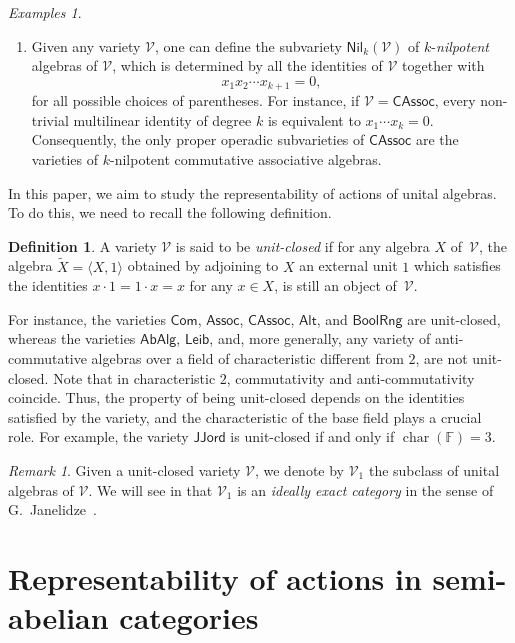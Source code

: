 \documentclass[reqno,a4paper]{amsart}
\theoremstyle{plain}
\theoremstyle{definition}
\newtheorem{definition}[subsection]{Definition}
\theoremstyle{remark}
\newtheorem{remark}[subsection]{Remark}
\newtheorem{examples}[subsection]{Examples}
\numberwithin{equation}{section}
\newcommand{\F}{\mathbb{F}}
\newcommand{\V}{\mathcal{V}}
\newcommand{\Assoc}{\ensuremath{\mathsf{Assoc}}}
\newcommand{\Leib}{\ensuremath{\mathsf{Leib}}}
\newcommand{\BoolRng}{\ensuremath{\mathsf{BoolRng}}}
\newcommand{\CAssoc}{\ensuremath{\mathsf{CAssoc}}}
\newcommand{\Com}{\ensuremath{\mathsf{Com}}}
\newcommand{\JJord}{\ensuremath{\mathsf{JJord}}}
\newcommand{\AbAlg}{\ensuremath{\mathsf{AbAlg}}}
\newcommand{\Nil}{\ensuremath{\mathsf{Nil}}}
\newcommand{\Alt}{\ensuremath{\mathsf{Alt}}}
\begin{document}
\begin{examples}
\begin{enumerate}
\item Given any variety $\V$, one can define the subvariety $\Nil_k(\V)$ of $k$-\emph{nilpotent} algebras of $\V$, which is determined by all the identities of $\V$ together with
\[
x_1 x_2 \cdots x_{k+1}=0,
\]
for all possible choices of parentheses. For instance, if $\V=\CAssoc$, every non-trivial multilinear identity of degree $k$ is equivalent to $x_1\cdots x_k=0$. Consequently, the only proper operadic subvarieties of $\CAssoc$ are the varieties of $k$-nilpotent commutative associative algebras.
\end{enumerate}
\end{examples}

In this paper, we aim to study the representability of actions of unital algebras. To do this, we need to recall the following definition.

\begin{definition}
A variety $\V$ is said to be \emph{unit-closed} if for any algebra $X$ of~$\V$, the algebra $\widetilde{X}=\langle X,1 \rangle$ obtained by adjoining to $X$ an external unit $1$ which satisfies the identities $x \cdot 1 = 1 \cdot x = x$ for any $x \in X$, is still an object of~$\V$. 
\end{definition}

For instance, the varieties $\Com$, $\Assoc$, $\CAssoc$, $\Alt$, and $\BoolRng$ are unit-closed, whereas the varieties $\AbAlg$, $\Leib$, and, more generally, any variety of anti-commutative algebras over a field of characteristic different from $2$, are not unit-closed. Note that in characteristic $2$, commutativity and anti-commutativity coincide. Thus, the property of being unit-closed depends on the identities satisfied by the variety, and the characteristic of the base field plays a crucial role. For example, the variety $\JJord$ is unit-closed if and only if $\operatorname{char}(\F)=3$. 

\begin{remark}
Given a unit-closed variety $\V$, we denote by $\V_1$ the subclass of unital algebras of $\V$. We will see in  that $\V_1$ is an \emph{ideally exact category} in the sense of G.~Janelidze~\cite{IdeallyExact}.
\end{remark}

\section{Representability of actions in semi-abelian categories}\label{SecAct}
\end{document}
